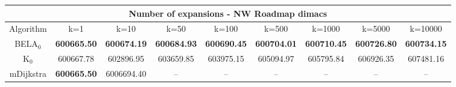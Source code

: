 \begin{tabular}{c|cccccccc}\toprule
\multicolumn{9}{c}{Number of expansions - NW Roadmap dimacs}\\ \midrule
Algorithm & k=1 & k=10 & k=50 & k=100 & k=500 & k=1000 & k=5000 & k=10000 \\ \midrule
BELA$_0$ & \textbf{600665.50} & \textbf{600674.19} & \textbf{600684.93} & \textbf{600690.45} & \textbf{600704.01} & \textbf{600710.45} & \textbf{600726.80} & \textbf{600734.15} \\
K$_0$ & 600667.78 & 602896.95 & 603659.85 & 603975.15 & 605094.97 & 605795.84 & 606926.35 & 607481.16 \\
mDijkstra & \textbf{600665.50} & 6006694.40 & -- & -- & -- & -- & -- & -- \\ \bottomrule 
\end{tabular}
